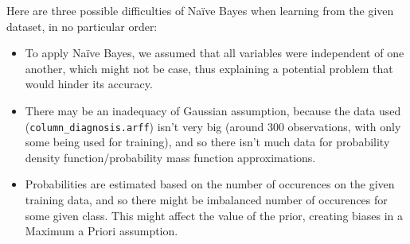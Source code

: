 \documentclass[12pt]{article}
\begin{document}
\begin{enumerate}[leftmargin=\labelsep]
          \vskip 0.3cm
          Here are three possible difficulties of Naïve Bayes when learning from the given dataset, in no particular order:

          \begin{itemize}
              \item To apply Naïve Bayes, we assumed that all variables were independent of one another, which might not be case, thus explaining a
                    potential problem that would hinder its accuracy.
              \item There may be an inadequacy of Gaussian assumption, because the data used (\texttt{column\_diagnosis.arff}) isn't very big
                    (around 300 observations, with only some being used for training), and so there isn't much data for probability density
                    function/probability mass function approximations.
              \item Probabilities are estimated based on the number of occurences on the given training data, and so there might be imbalanced
                    number of occurences for some given class. This might affect the value of the prior, creating biases in a Maximum a Priori
                    assumption.
          \end{itemize}
\end{enumerate}
\end{document}
